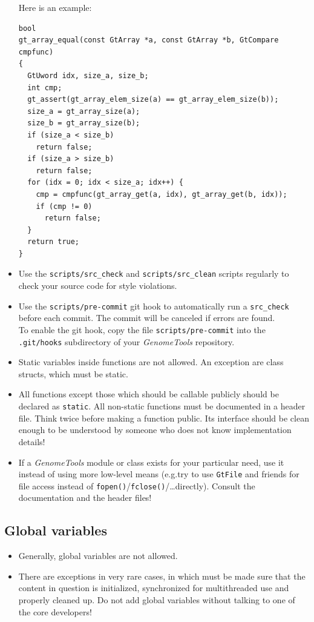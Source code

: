 \documentclass[11pt,final]{article}
\newcommand{\keyword}[1]{\lstinline{#1}}
\newcommand{\Gt}[0]{\emph{GenomeTools}\xspace}
\begin{document}
\begin{itemize}
Here is an example:
\begin{lstlisting}
bool
gt_array_equal(const GtArray *a, const GtArray *b, GtCompare cmpfunc)
{
  GtUword idx, size_a, size_b;
  int cmp;
  gt_assert(gt_array_elem_size(a) == gt_array_elem_size(b));
  size_a = gt_array_size(a);
  size_b = gt_array_size(b);
  if (size_a < size_b)
    return false;
  if (size_a > size_b)
    return false;
  for (idx = 0; idx < size_a; idx++) {
    cmp = cmpfunc(gt_array_get(a, idx), gt_array_get(b, idx));
    if (cmp != 0)
      return false;
  }
  return true;
}
\end{lstlisting}
\item
Use the \keyword{scripts/src_check} and \keyword{scripts/src_clean} scripts
regularly to check your source code for style violations.
\item
Use the \keyword{scripts/pre-commit} git hook to automatically run a
\keyword{src_check}
before each commit. The commit will be canceled if errors are found.\\
To enable the git hook, copy the file \keyword{scripts/pre-commit} into the
\keyword{.git/hooks} subdirectory of your \Gt repository.
\item
Static variables inside functions are not allowed. An exception are class
structs, which must be static.
\item
All functions except those which should be callable publicly should be declared
as \keyword{static}. All non-static functions must be documented in a
header file.
Think twice before making a function public. Its interface should be clean
enough to be understood by someone who does not know implementation details!
\item
If a \Gt module or class exists for your particular need, use it instead of
using more low-level means (e.g.\@ try to use \keyword{GtFile} and friends for
file access instead of \keyword{fopen()}/\keyword{fclose()}/\dots\@ directly).
Consult the documentation and the header files!
\end{itemize}

\subsection{Global variables}
\begin{itemize}
\item
Generally, global variables are not allowed.
\item
There are exceptions in very rare cases, in which must be made sure that the
content in question is initialized, synchronized for multithreaded use and
properly cleaned up. Do not add global variables without talking to one of the
core developers!
\end{itemize}
\end{document}
